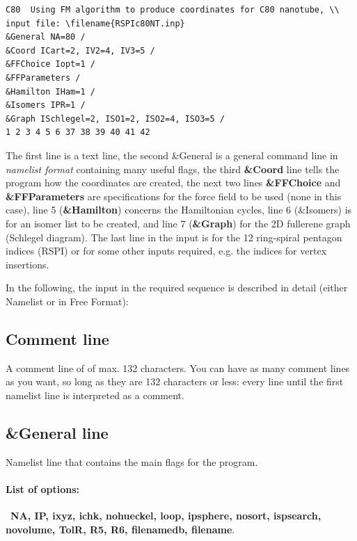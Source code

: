 \documentclass[article,a4paper,twoside]{memoir}
\newcommand{\filename}[1]{\texttt{#1}}
\newcommand{\paramname}[1]{{\color{green}\textbf{#1}}}
\begin{document}
\begin{verbatim}
C80  Using FM algorithm to produce coordinates for C80 nanotube, \\
input file: \filename{RSPIc80NT.inp}
&General NA=80 / 
&Coord ICart=2, IV2=4, IV3=5 / 
&FFChoice Iopt=1 / 
&FFParameters / 
&Hamilton IHam=1 / 
&Isomers IPR=1 / 
&Graph ISchlegel=2, ISO1=2, ISO2=4, ISO3=5 / 
1 2 3 4 5 6 37 38 39 40 41 42 
\end{verbatim}
The first line is a text line, the second \&General is a general
command line in \textit{namelist format} containing many useful flags,
the third \paramname{\&Coord} line tells the program how the
coordinates are created, the next two lines \paramname{\&FFChoice}
and \paramname{\&FFParameters} are specifications for the force field
to be used (none in this case), line 5 (\paramname{\&Hamilton})
concerns the Hamiltonian cycles, line 6 (\&Isomers) is for an isomer list
to be created, and line 7 (\paramname{\&Graph}) for the 2D fullerene
graph (Schlegel diagram). The last line in the input is for the 12
ring-spiral pentagon indices (RSPI) or for some other inputs required, e.g.
the indices for vertex insertions.

In the following, the input in the required sequence is described in detail (either Namelist or in Free Format):

\subsection{Comment line} 
A comment line of of max. 132 characters. You can have as many comment lines as you want, so long as they are 132 characters or less: 
every line until the first namelist line is interpreted as a comment.

\subsection{\&General line}
Namelist line that contains the main flags for the program. 

\paragraph{List of options:}\  \paramname{NA, IP, ixyz, ichk, nohueckel, loop, ipsphere, nosort, ispsearch, novolume, TolR, R5, R6, filenamedb, filename}.
\end{document}
